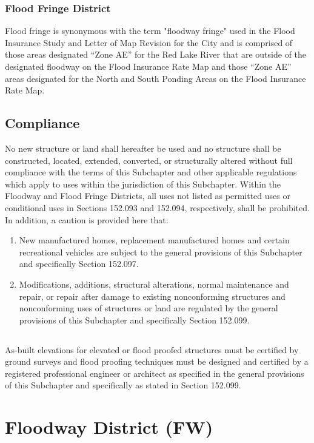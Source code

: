 \subsubsection{Flood Fringe District}
Flood fringe is synonymous with the term "floodway fringe" used in the Flood Insurance Study and Letter of Map Revision for the City and is comprised of those areas designated “Zone AE” for the Red Lake River that are outside of the designated floodway on the Flood Insurance Rate Map and those “Zone AE” areas designated for the North and South Ponding Areas on the Flood Insurance Rate Map.
\subsection{Compliance}
No new structure or land shall hereafter be used and no structure shall be constructed, located, extended, converted, or structurally altered without full compliance with the terms of this Subchapter and other applicable regulations which apply to uses within the jurisdiction of this Subchapter. Within the Floodway and Flood Fringe Districts, all uses not listed as permitted uses or conditional uses in Sections 152.093 and 152.094, respectively, shall be prohibited. In addition, a caution is provided here that:
\begin{enumerate}[{\indent}1)]
    \item New manufactured homes, replacement manufactured homes and certain recreational vehicles are subject to the general provisions of this Subchapter and specifically Section 152.097.
    \item Modifications, additions, structural alterations, normal maintenance and repair, or repair after damage to existing nonconforming structures and nonconforming uses of structures or land are regulated by the general provisions of this Subchapter and specifically Section 152.099.
\end{enumerate}
\subsection{}
As-built elevations for elevated or flood proofed structures must be certified by ground surveys and flood proofing techniques must be designed and certified by a registered professional engineer or architect as specified in the general provisions of this Subchapter and specifically as stated in Section 152.099.

\section{Floodway District (FW)}
